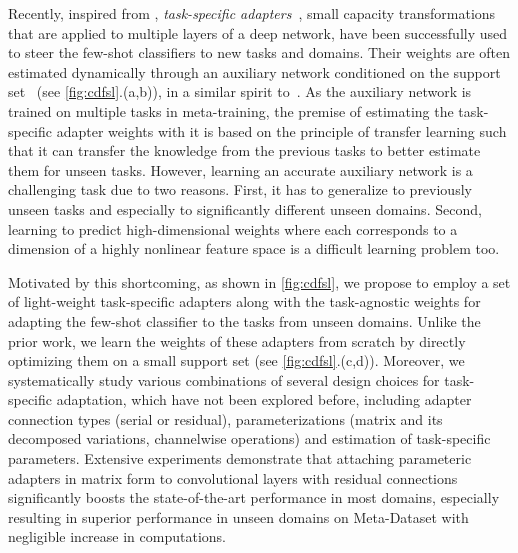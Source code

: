 Recently, inspired from \cite{perez2018film}, \emph{task-specific adapters}~\cite{requeima2019fast,bateni2020improved}, small capacity transformations that are applied to multiple layers of a deep network, have been successfully used to steer the few-shot classifiers to new tasks and domains.
Their weights are often estimated dynamically through an auxiliary network conditioned on the support set~\cite{requeima2019fast,bateni2020improved,liu2020universal,triantafillou2021flute} (see \cref{fig:cdfsl}.(a,b)), in a similar spirit to~\cite{bertinetto2016learning,jia2016dynamic}.
As the auxiliary network is trained on multiple tasks in meta-training, the premise of estimating the task-specific adapter weights with it is based on the principle of transfer learning such that it can transfer the knowledge from the previous tasks to better estimate them for unseen tasks.
However, learning an accurate auxiliary network is a challenging task due to two reasons.
First, it has to generalize to previously unseen tasks and especially to significantly different unseen domains.
Second, learning to predict high-dimensional weights where each corresponds to a dimension of a highly nonlinear feature space is a difficult learning problem too.



Motivated by this shortcoming, as shown in \cref{fig:cdfsl}, we propose to employ a set of light-weight task-specific adapters along with the task-agnostic weights for adapting the few-shot classifier to the tasks from unseen domains.
Unlike the prior work, we learn the weights of these adapters from scratch by directly optimizing them on a small support set (see \cref{fig:cdfsl}.(c,d)).
Moreover, we systematically study various combinations of several design choices for task-specific adaptation, which have not been explored before, including adapter connection types (serial or residual), parameterizations (matrix and its decomposed variations, channelwise operations) and estimation of task-specific parameters.
Extensive experiments demonstrate that attaching parameteric adapters in matrix form to convolutional layers with residual connections significantly boosts the state-of-the-art performance in most domains, especially resulting in superior performance in unseen domains on Meta-Dataset with negligible increase in computations.


